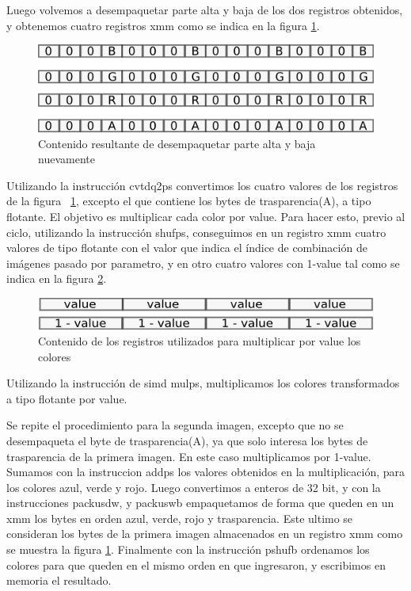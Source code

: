 \documentclass[a4paper]{article}
\begin{document}
Luego volvemos a desempaquetar parte alta y baja de los dos registros obtenidos, y obtenemos cuatro registros xmm como se indica en la figura \ref{cuartoXmm}.


\begin{figure}[H]
\centering
\includegraphics[scale=0.8]{imagenes/cuartoXmm.png}
\caption{Contenido resultante de desempaquetar parte alta y baja nuevamente}
\label{cuartoXmm}
\end{figure}

Utilizando la instrucción cvtdq2ps convertimos los cuatro valores de los registros de la figura ~\ref{cuartoXmm}, excepto el que contiene los bytes de trasparencia(A), a tipo flotante. El objetivo es multiplicar cada color por value. Para hacer esto, previo al ciclo, utilizando la instrucción shufps, conseguimos en un registro xmm cuatro valores de tipo flotante con el valor que indica el índice de combinación de imágenes pasado por parametro, y en otro cuatro valores con 1-value tal como se indica en la figura \ref{value}.

\begin{figure}[H]
\centering
\includegraphics[scale=0.8]{imagenes/value.png}
\caption{Contenido de los registros utilizados para multiplicar por value los colores}
\label{value}
\end{figure}


Utilizando la instrucción de simd mulps, multiplicamos los colores transformados a tipo flotante por value.

Se repite el procedimiento para la segunda imagen, excepto que no se desempaqueta el byte de trasparencia(A), ya que solo interesa los bytes de trasparencia de la primera imagen. En este caso multiplicamos por 1-value. Sumamos con la instruccion addps los valores obtenidos en la multiplicación, para los colores azul, verde y rojo. Luego convertimos a enteros de 32 bit, y con la instrucciones packusdw, y packuswb empaquetamos de forma que queden en un xmm los bytes en orden azul, verde, rojo y trasparencia. Este ultimo se consideran los bytes de la primera imagen almacenados en un registro xmm como se muestra la figura \ref{cuartoXmm}. Finalmente con la instrucción pshufb ordenamos los colores para que queden en el mismo orden en que ingresaron, y escribimos en memoria el resultado.
\end{document}
